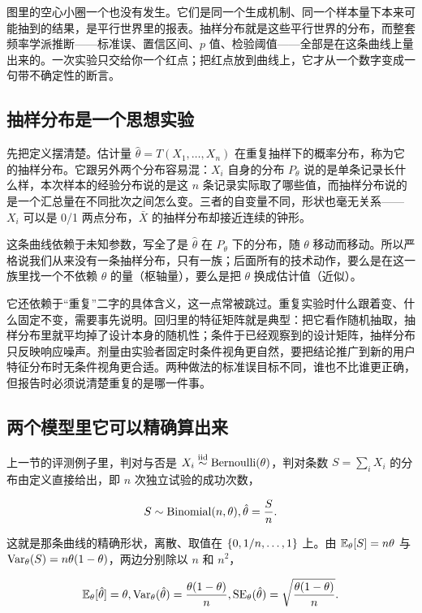 图里的空心小圈一个也没有发生。它们是同一个生成机制、同一个样本量下本来可能抽到的结果，是平行世界里的报表。抽样分布就是这些平行世界的分布，而整套频率学派推断——标准误、置信区间、\(p\) 值、检验阈值——全部是在这条曲线上量出来的。一次实验只交给你一个红点；把红点放到曲线上，它才从一个数字变成一句带不确定性的断言。

\subsection{抽样分布是一个思想实验}

先把定义摆清楚。估计量 \(\hat\theta=T(X_1,\ldots,X_n)\) 在重复抽样下的概率分布，称为它的抽样分布。它跟另外两个分布容易混：\(X_i\) 自身的分布 \(P_\theta\) 说的是单条记录长什么样，本次样本的经验分布说的是这 \(n\) 条记录实际取了哪些值，而抽样分布说的是一个汇总量在不同批次之间怎么变。三者的自变量不同，形状也毫无关系——\(X_i\) 可以是 0/1 两点分布，\(\bar X\) 的抽样分布却接近连续的钟形。

这条曲线依赖于未知参数，写全了是 \(\hat\theta\) 在 \(P_\theta\) 下的分布，随 \(\theta\) 移动而移动。所以严格说我们从来没有一条抽样分布，只有一族；后面所有的技术动作，要么是在这一族里找一个不依赖 \(\theta\) 的量（枢轴量），要么是把 \(\theta\) 换成估计值（近似）。

它还依赖于``重复''二字的具体含义，这一点常被跳过。重复实验时什么跟着变、什么固定不变，需要事先说明。回归里的特征矩阵就是典型：把它看作随机抽取，抽样分布里就平均掉了设计本身的随机性；条件于已经观察到的设计矩阵，抽样分布只反映响应噪声。剂量由实验者固定时条件视角更自然，要把结论推广到新的用户特征分布时无条件视角更合适。两种做法的标准误目标不同，谁也不比谁更正确，但报告时必须说清楚重复的是哪一件事。

\subsection{两个模型里它可以精确算出来}

上一节的评测例子里，判对与否是 \(X_i\overset{\mathrm{iid}}{\sim}\operatorname{Bernoulli}(\theta)\)，判对条数 \(S=\sum_i X_i\) 的分布由定义直接给出，即 \(n\) 次独立试验的成功次数，

\[
S\sim\operatorname{Binomial}(n,\theta),\space\hat\theta=\frac Sn.
\]

这就是那条曲线的精确形状，离散、取值在 \(\left\{0,1/n,\ldots,1\right\}\) 上。由 \(\mathbb{E}_\theta[S]=n\theta\) 与 \(\operatorname{Var}_\theta(S)=n\theta(1-\theta)\)，两边分别除以 \(n\) 和 \(n^2\)，

\[
\mathbb{E}_\theta[\hat\theta]=\theta,
\space
\operatorname{Var}_\theta(\hat\theta)=\frac{\theta(1-\theta)}n,
\space
\operatorname{SE}_\theta(\hat\theta)=\sqrt{\frac{\theta(1-\theta)}n}.
\]

